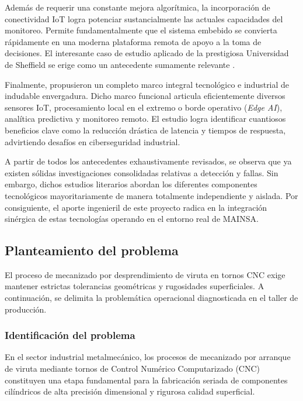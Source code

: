 Además de requerir una constante mejora algorítmica, la incorporación de conectividad IoT logra potenciar sustancialmente las actuales capacidades del monitoreo. Permite fundamentalmente que el sistema embebido se convierta rápidamente en una moderna plataforma remota de apoyo a la toma de decisiones. El interesante caso de estudio aplicado de la prestigiosa Universidad de Sheffield se erige como un antecedente sumamente relevante \citep{sheffield2021}.

Finalmente, \cite{hamasha2025} propusieron un completo marco integral tecnológico e industrial de indudable envergadura. Dicho marco funcional articula eficientemente diversos sensores IoT, procesamiento local en el extremo o borde operativo (\textit{Edge AI}), analítica predictiva y monitoreo remoto. El estudio logra identificar cuantiosos beneficios clave como la reducción drástica de latencia y tiempos de respuesta, advirtiendo desafíos en ciberseguridad industrial.

A partir de todos los antecedentes exhaustivamente revisados, se observa que ya existen sólidas investigaciones consolidadas relativas a detección y fallas. Sin embargo, dichos estudios literarios abordan los diferentes componentes tecnológicos mayoritariamente de manera totalmente independiente y aislada. Por consiguiente, el aporte ingenieril de este proyecto radica en la integración sinérgica de estas tecnologías operando en el entorno real de MAINSA.

\subsection{Planteamiento del problema}
\label{subsec:planteamiento_problema}

El proceso de mecanizado por desprendimiento de viruta en tornos CNC exige mantener estrictas tolerancias geométricas y rugosidades superficiales. A continuación, se delimita la problemática operacional diagnosticada en el taller de producción.

\subsubsection{Identificación del problema}
\label{subsubsec:identificacion_problema}

En el sector industrial metalmecánico, los procesos de mecanizado por arranque de viruta mediante tornos de Control Numérico Computarizado (CNC) constituyen una etapa fundamental para la fabricación seriada de componentes cilíndricos de alta precisión dimensional y rigurosa calidad superficial.

